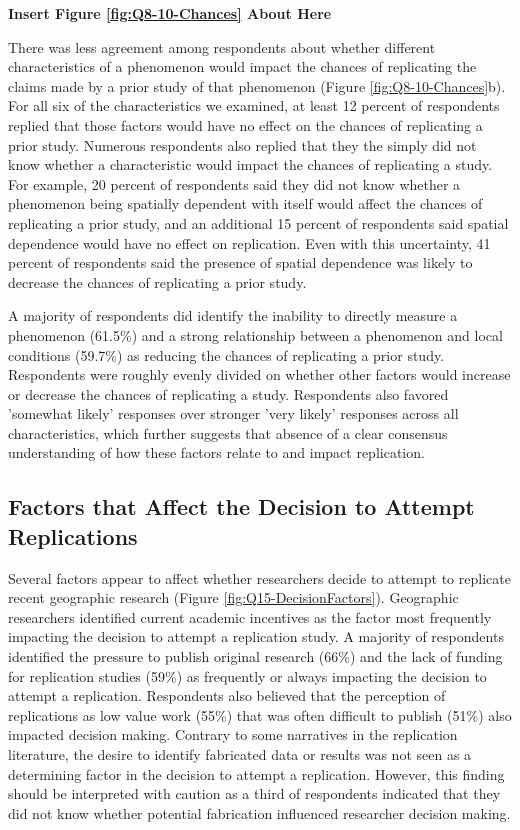 \documentclass[]{interact}
\theoremstyle{plain}%
\theoremstyle{definition}
\theoremstyle{remark}
\begin{document}
\begin{center}
\textbf{Insert Figure \ref{fig:Q8-10-Chances} About Here}
\end{center}

There was less agreement among respondents about whether different characteristics of a phenomenon would impact the chances of replicating the claims made by a prior study of that phenomenon (Figure \ref{fig:Q8-10-Chances}b). 
For all six of the characteristics we examined, at least 12 percent of respondents replied that those factors would have no effect on the chances of replicating a prior study.
Numerous respondents also replied that they the simply did not know whether a characteristic would impact the chances of replicating a study. 
For example, 20 percent of respondents said they did not know whether a phenomenon being spatially dependent with itself would affect the chances of replicating a prior study, and an additional 15 percent of respondents said spatial dependence would have no effect on replication. 
Even with this uncertainty, 41 percent of respondents said the presence of spatial dependence was likely to decrease the chances of replicating a prior study.

A majority of respondents did identify the inability to directly measure a phenomenon (61.5\%) and a strong relationship between a phenomenon and local conditions (59.7\%) as reducing the chances of replicating a prior study.
Respondents were roughly evenly divided on whether other factors would increase or decrease the chances of replicating a study.
Respondents also favored 'somewhat likely' responses over stronger 'very likely' responses across all characteristics, which further suggests that absence of a clear consensus understanding of how these factors relate to and impact replication.


\subsection*{Factors that Affect the Decision to Attempt Replications}
Several factors appear to affect whether researchers decide to attempt to replicate recent geographic research (Figure \ref{fig:Q15-DecisionFactors}).
Geographic researchers identified current academic incentives as the factor most frequently impacting the decision to attempt a replication study. 
A majority of respondents identified the pressure to publish original research (66\%) and the lack of funding for replication studies (59\%) as frequently or always impacting the decision to attempt a replication.
Respondents also believed that the perception of replications as low value work (55\%) that was often difficult to publish (51\%) also impacted decision making.  
Contrary to some narratives in the replication literature, the desire to identify fabricated data or results was not seen as a determining factor in the decision to attempt a replication. 
However, this finding should be interpreted with caution as a third of respondents indicated that they did not know whether potential fabrication influenced researcher decision making.  
\end{document}

